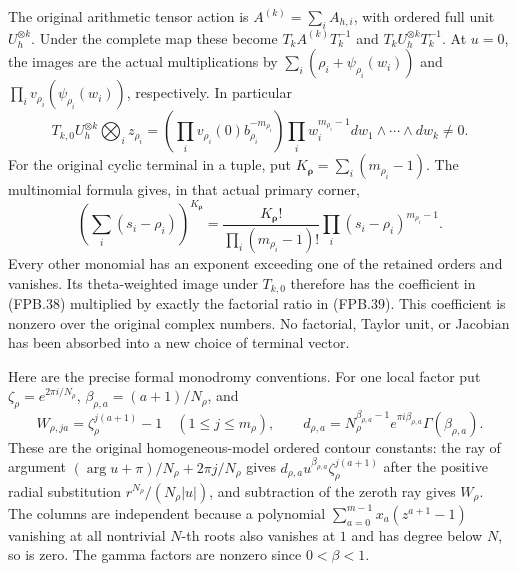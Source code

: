 The original arithmetic tensor action is \(A^{(k)}=\sum_i A_{h,i}\),
with ordered full unit \(U_h^{\otimes k}\). Under the complete map
these become \(T_k A^{(k)}T_k^{-1}\) and
\(T_kU_h^{\otimes k}T_k^{-1}\). At \(u=0\), the images are the
actual multiplications by \(\sum_i(\rho_i+\psi_{\rho_i}(w_i))\)
and \(\prod_i v_{\rho_i}(\psi_{\rho_i}(w_i))\), respectively.
In particular
\[
 T_{k,0}U_h^{\otimes k}\bigotimes_i z_{\rho_i}
   =\left(\prod_i v_{\rho_i}(0)b_{\rho_i}^{-m_{\rho_i}}\right)
        \prod_i w_i^{m_{\rho_i}-1}
                  dw_1\wedge\cdots\wedge dw_k\ne0.
 \tag{FPB.38}\label{eq:fpb-tensor-terminal}
\]
For the original cyclic terminal in a tuple, put
\(K_{\boldsymbol\rho}=\sum_i(m_{\rho_i}-1)\).
The multinomial formula gives, in that actual primary corner,
\[
 \left(\sum_i(s_i-\rho_i)\right)^{K_{\boldsymbol\rho}}
   =\frac{K_{\boldsymbol\rho}!}{\prod_i(m_{\rho_i}-1)!}
                  \prod_i(s_i-\rho_i)^{m_{\rho_i}-1}.
 \tag{FPB.39}\label{eq:fpb-cyclic-terminal}
\]
Every other monomial has an exponent exceeding one of the retained
orders and vanishes. Its theta-weighted image under \(T_{k,0}\)
therefore has the coefficient in (FPB.38) multiplied by exactly the
factorial ratio in (FPB.39). This coefficient is nonzero over the
original complex numbers. No factorial, Taylor unit, or Jacobian has
been absorbed into a new choice of terminal vector.

Here are the precise formal monodromy conventions. For one local
factor put \(\zeta_\rho=e^{2\pi i/N_\rho}\),
\(\beta_{\rho,a}=(a+1)/N_\rho\), and
\[
 W_{\rho,j a}=\zeta_\rho^{j(a+1)}-1\quad(1\le j\le m_\rho),
 \qquad
 d_{\rho,a}=N_\rho^{\beta_{\rho,a}-1}
           e^{\pi i\beta_{\rho,a}}\Gamma(\beta_{\rho,a}).
 \tag{FPB.40}\label{eq:fpb-local-constants}
\]
These are the original homogeneous-model ordered contour constants:
the ray of argument \((\arg u+\pi)/N_\rho+2\pi j/N_\rho\)
gives \(d_{\rho,a}u^{\beta_{\rho,a}}\zeta_\rho^{j(a+1)}\)
after the positive radial substitution \(r^{N_\rho}/(N_\rho|u|)\),
and subtraction of the zeroth ray gives \(W_\rho\). The columns
are independent because a polynomial
\(\sum_{a=0}^{m-1}x_a(z^{a+1}-1)\) vanishing at all nontrivial
\(N\)-th roots also vanishes at \(1\) and has degree below \(N\),
so is zero. The gamma factors are nonzero since \(0<\beta<1\).

